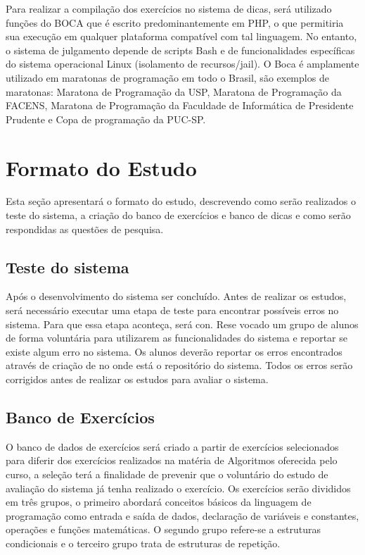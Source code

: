 Para realizar a compilação dos exercícios no sistema de dicas, será utilizado funções do  BOCA  que é escrito predominantemente em PHP, o que permitiria sua execução em qualquer plataforma compatível com tal linguagem. No entanto, o sistema de julgamento depende de scripts Bash e de funcionalidades específicas do sistema operacional Linux (isolamento de recursos/jail). O Boca é amplamente utilizado em maratonas de programação em todo o Brasil, são exemplos de maratonas: Maratona de Programação da USP, Maratona de Programação da FACENS, Maratona de Programação da Faculdade de Informática de Presidente Prudente e Copa de programação da PUC-SP. 

\section{Formato do Estudo}

Esta seção apresentará o formato do estudo, descrevendo como serão realizados o teste do sistema, a criação do banco de exercícios e banco de dicas e como serão respondidas as questões de pesquisa.

\subsection{Teste do sistema}

Após o desenvolvimento do sistema ser concluído. Antes de realizar os estudos, será necessário executar uma etapa de teste para encontrar possíveis erros no sistema. Para que essa etapa aconteça, será con. Rese vocado um grupo de alunos de forma voluntária para utilizarem as funcionalidades do sistema e reportar se existe algum erro no sistema. Os alunos deverão reportar os erros encontrados através de criação de  no  onde está o repositório do sistema. Todos os erros serão corrigidos antes de realizar os estudos para avaliar o sistema.

\subsection{Banco de Exercícios}

O banco de dados de exercícios será criado a partir de exercícios selecionados para diferir dos exercícios realizados na matéria de Algoritmos oferecida pelo curso, a seleção terá a finalidade de prevenir que o voluntário do estudo de avaliação do sistema já tenha realizado o exercício. Os exercícios serão divididos em três grupos, o primeiro abordará conceitos básicos da linguagem de programação como entrada e saída de dados, declaração de variáveis e constantes, operações e funções matemáticas. O segundo grupo refere-se a estruturas condicionais e o terceiro grupo trata de estruturas de repetição.

